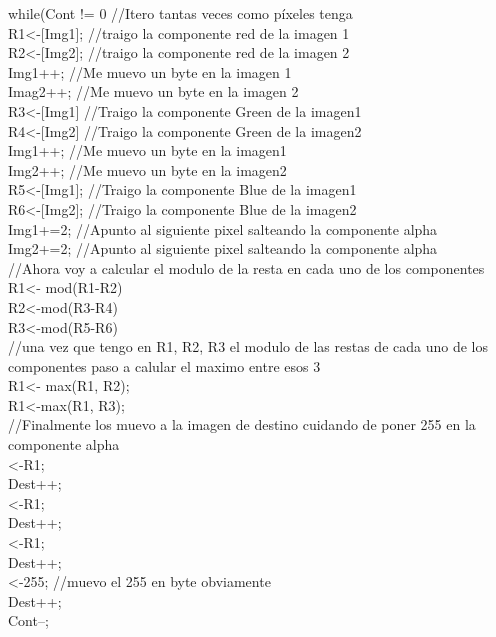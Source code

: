 while(Cont != 0{  		//Itero tantas veces como píxeles tenga\\
	R1<-[Img1];  		//traigo la componente red de la imagen 1\\
	R2<-[Img2]; 	 	//traigo la componente red de la imagen 2\\
	Img1++; 	 	//Me muevo un byte en la imagen 1\\
	Imag2++; 		//Me muevo un byte en la imagen 2\\
	R3<-[Img1] 		//Traigo la componente Green de la imagen1\\
	R4<-[Img2] 		//Traigo la componente Green de la imagen2\\
	Img1++; 		//Me muevo un byte en la imagen1\\
	Img2++;        		//Me muevo un byte en la imagen2\\
	R5<-[Img1]; 		//Traigo la componente Blue de la imagen1\\
	R6<-[Img2]; 		//Traigo la componente Blue de la imagen2\\
	Img1+=2;		//Apunto al siguiente pixel salteando la componente alpha\\
	Img2+=2; 		//Apunto al siguiente pixel salteando la componente alpha\\
	//Ahora voy a calcular el modulo de la resta en cada uno de los componentes\\
	R1<- mod(R1-R2)\\
	R2<-mod(R3-R4)\\
	R3<-mod(R5-R6)\\
	//una vez que tengo  en R1, R2, R3 el modulo de las restas de cada uno de los componentes paso a calular el maximo entre esos 3\\
	R1<- max(R1, R2); \\
	R1<-max(R1, R3);\\
	//Finalmente los muevo a la imagen de destino cuidando de poner 255 en la componente alpha\\
	[Dest]<-R1;\\
	Dest++;\\
	[Dest]<-R1;\\
	Dest++;\\
	[Dest]<-R1;\\
	Dest++;\\
	[Dest]<-255; 		//muevo el 255 en byte obviamente\\
	Dest++;\\
	Cont--;\\

}\\ \\
